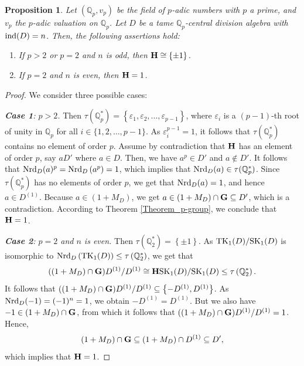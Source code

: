 \documentclass{amsart}
\newtheorem{proposition}[theorem]{Proposition}
\theoremstyle{definition}
\numberwithin{equation}{section} %
\begin{document}
\begin{proposition}\label{corollary_Qp}
	Let $(\mathbb{Q}_p,v_p)$ be the field of $p$-adic numbers with $p$ a prime, and $v_p$ the $p$-adic valuation on $\mathbb{Q}_p$. Let $D$ be a tame ${\mathbb{Q}_p}$-central division algebra with ${\rm ind}(D) = n$. Then, the following assertions hold:
	\begin{enumerate}[font=\normalfont]
		\item If $p>2$ or  $p=2$ and $n$ is odd, then ${\bf H}\cong \{\pm 1\}$.
		\item If $p=2$ and $n$ is even, then ${\bf H}=1$.
	\end{enumerate}
\end{proposition}
\begin{proof}
	We consider three possible cases:
	
	\medskip 
	
	\medskip 
	
	\textit{\textbf{Case 1}: $p>2$. } Then $\tau\left(\mathbb{Q}_p^*\right) = \left\{\varepsilon_1,\varepsilon_2,\ldots,\varepsilon_{p-1}\right\}$, where $\varepsilon_i$ is a $(p-1)$-th root of unity in $\mathbb{Q}_p$ for all $i \in \{1,2,\ldots,p-1\}$. As $\varepsilon_i^{p-1} = 1$, it follows that $\tau\left(\mathbb{Q}_p^*\right)$ contains no element of order $p$. Assume by contradiction that ${\bf H}$ has an element of order $p$, say $aD'$ where $a\in D$. Then, we have $a^p \in D'$ and $a \notin D'$. It follows that ${\rm Nrd}_D(a)^p= {\rm Nrd}_D\left(a^p\right) =1$, which implies that ${\rm Nrd}_D(a) \in \tau(\mathbb{Q}_p^*)$. Since $\tau(\mathbb{Q}_p^*)$ has no elements of order $p$, we get that ${\rm Nrd}_D(a) =1$, and hence $a \in D^{(1)}$. Because $a\in \left(1+M_D\right)$, we get $a \in \left(1+M_D\right)\cap {\bf G} \subseteq D'$, which is a contradiction. According to Theorem \ref{Theorem_p-group}, we conclude that ${\bf H}=1$.
	
	\medskip 
	
	\textit{\textbf{Case 2}: $p=2$ and $n$ is even.} Then $\tau\left(\mathbb{Q}_2^*\right) = \left\{\pm1\right\}$. As ${\rm TK}_1(D)/{\rm SK}_1(D)$ is isomorphic to $ {\rm Nrd}_D\left({\rm TK}_1(D)\right) \le \tau\left(\mathbb{Q}_2^*\right)$, we get that
	$$
	((1+M_D)\cap {\bf G})D^{(1)}/D^{(1)} \cong {\bf H}{\rm SK}_1(D)/{\rm 
		SK}_1(D)  \le 
	\tau\left(\mathbb{Q}_2^*\right).
	$$
	It follows that $((1+M_D)\cap {\bf G})D^{(1)}/D^{(1)} \subseteq \left\{-D^{(1)},D^{(1)}\right\}$. As ${\rm Nrd}_D(-1) = (-1)^n = 1$, we obtain $-D^{(1)} = D^{(1)}$. But we also have $-1 \in\left(1+M_D\right)\cap {\bf G}$, from which it follows that $((1+M_D)\cap {\bf G})D^{(1)}/D^{(1)} = 1$. Hence,
	$$
	\left(1+M_D\right)\cap {\bf G} \subseteq \left(1+M_D\right) \cap D^{(1)} \subseteq D',
	$$
	which implies that ${\bf H}=1$.
	

\end{proof}
\end{document}
